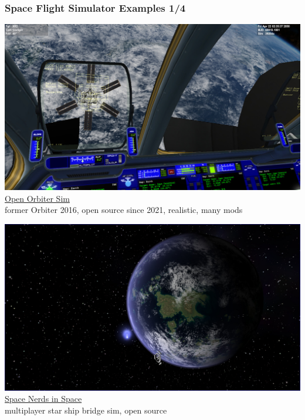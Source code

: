 \documentclass[aspectratio=169,11pt,xcolor=dvipsnames]{beamer}
\begin{document}
\begin{frame}
  \frametitle{Space Flight Simulator Examples 1/4}
  \begin{minipage}[t]{0.49\textwidth}
    \begin{center}
      \includegraphics[width=\textwidth]{orbiter}\\
      \href{https://openorbiter.space/}{Open Orbiter Sim}\\
      former Orbiter 2016, open source since 2021, realistic, many mods
    \end{center}
  \end{minipage}
  \begin{minipage}[t]{0.49\textwidth}
    \begin{center}
      \includegraphics[width=\textwidth]{nerds}\\
      \href{https://smcameron.github.io/space-nerds-in-space/}{Space Nerds in Space}\\
      multiplayer star ship bridge sim, open source
    \end{center}
  \end{minipage}
\end{frame}
\end{document}
